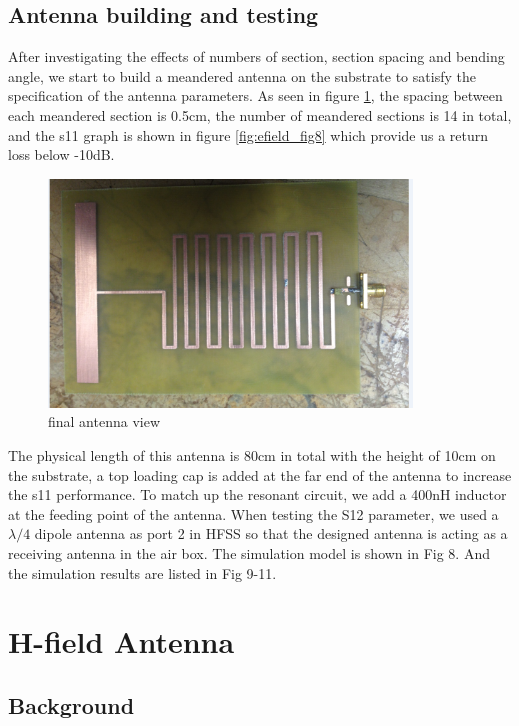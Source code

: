 \section{Antenna building and testing}

After investigating the effects of numbers of section, section spacing and bending angle, we start to build a meandered antenna on the substrate to satisfy the specification of the antenna parameters. As seen in figure \ref{fig:efield_fig7}, the spacing between each meandered section is 0.5cm, the number of meandered sections is 14 in total, and the s11 graph is shown in figure \ref{fig:efield_fig8} which provide us a return loss below -10dB.

\begin{figure}[h]
	\begin{center}
		\includegraphics[width=3.8in]{./images/efield_image6.png}
		\caption{final antenna view}
		\label{fig:efield_fig7}
	\end{center}
\end{figure}

The physical length of this antenna is 80cm in total with the height of 10cm on the substrate, a top loading cap is added at the far end of the antenna to increase the s11 performance. To match up the resonant circuit, we add a 400nH inductor at the feeding point of the antenna. When testing the S12 parameter, we used a $\lambda/4$ dipole antenna as port 2 in HFSS so that the designed antenna is acting as a receiving antenna in the air box. The simulation model is shown in Fig 8. And the simulation results are listed in Fig 9-11.




\chapter{H-field Antenna}
\label{sec:H-field Antenna}

\section{Background}

